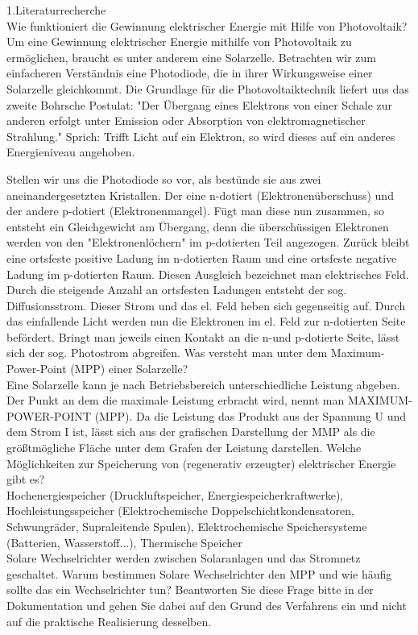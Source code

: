 \documentclass[a4paper,12pt]{article}
\begin{document}
1.Literaturrecherche\\
Wie funktioniert die Gewinnung elektrischer Energie mit Hilfe von Photovoltaik?\\
Um eine Gewinnung elektrischer Energie mithilfe von Photovoltaik zu ermöglichen, braucht es unter anderem eine Solarzelle. Betrachten wir zum einfacheren Verständnis eine Photodiode, die in ihrer Wirkungsweise einer Solarzelle gleichkommt. 
Die Grundlage für die Photovoltaiktechnik liefert uns das zweite Bohrsche Postulat: "Der Übergang eines Elektrons von einer Schale zur anderen erfolgt unter Emission oder Absorption von elektromagnetischer Strahlung." Sprich: Trifft Licht auf ein Elektron, so wird dieses auf ein anderes Energieniveau angehoben. 

Stellen wir uns die Photodiode so vor, als bestünde sie aus zwei aneinandergesetzten Kristallen. Der eine n-dotiert (Elektronenüberschuss) und der andere p-dotiert (Elektronenmangel). Fügt man diese nun zusammen, so entsteht ein Gleichgewicht am Übergang, denn die überschüssigen Elektronen werden von den "Elektronenlöchern" im p-dotierten Teil angezogen. Zurück bleibt eine ortsfeste positive Ladung im n-dotierten Raum und eine ortsfeste negative Ladung im p-dotierten Raum. Diesen Ausgleich bezeichnet man elektrisches Feld. Durch die steigende Anzahl an ortsfesten Ladungen entsteht der sog. Diffusionsstrom. Dieser Strom und das el. Feld heben sich gegenseitig auf.
Durch das einfallende Licht werden nun die Elektronen im el. Feld zur n-dotierten Seite befördert. Bringt man jeweils einen Kontakt an die n-und p-dotierte Seite, lässt sich der sog. Photostrom abgreifen. 
Was versteht man unter dem Maximum-Power-Point (MPP) einer Solarzelle?\\
Eine Solarzelle kann je nach Betriebsbereich unterschiedliche Leistung abgeben. Der Punkt an dem die maximale Leistung erbracht wird, nennt man MAXIMUM-POWER-POINT (MPP). Da die Leistung das Produkt aus der Spannung U und dem Strom I ist, lässt sich aus der grafischen Darstellung der MMP als die größtmögliche Fläche unter dem Grafen der Leistung darstellen.
Welche Möglichkeiten zur Speicherung von (regenerativ erzeugter) elektrischer Energie
gibt es?\\
Hochenergiespeicher (Druckluftspeicher, Energiespeicherkraftwerke), Hochleistungsspeicher (Elektrochemische Doppelschichtkondensatoren, Schwungräder, Supraleitende Spulen), Elektrochemische Speichersysteme (Batterien, Wasserstoff...), Thermische Speicher\\

Solare Wechselrichter werden zwischen Solaranlagen und das Stromnetz geschaltet.
Warum bestimmen Solare Wechselrichter den MPP und wie häufig sollte das ein Wechselrichter
tun? Beantworten Sie diese Frage bitte in der Dokumentation und gehen Sie
dabei auf den Grund des Verfahrens ein und nicht auf die praktische Realisierung desselben.\\
 
\end{document}
